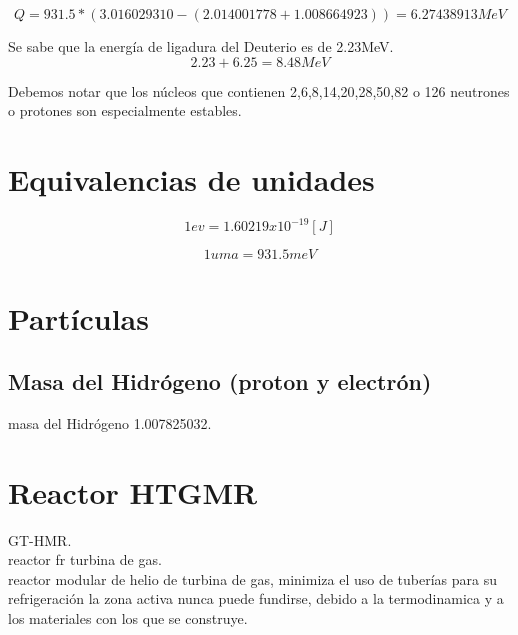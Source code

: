 \documentclass[]{article}
\begin{document}
\begin{equation}
Q=931.5*(3.016029310-(2.014001778+1.008664923))=6.27438913MeV
\end{equation}

Se sabe que la energía de ligadura del Deuterio es de 2.23MeV.\\

\begin{equation}
2.23+6.25=8.48 MeV
\end{equation}

Debemos notar que los núcleos que contienen 2,6,8,14,20,28,50,82 o 126 neutrones o protones son especialmente estables.\\



\section{Equivalencias de unidades}

\begin{equation}
   1ev=1.60219x10^{-19} [J]
\end{equation}

\begin{equation}
   1uma=931.5meV
\end{equation}


\section{Partículas}

\subsection{Masa del Hidrógeno (proton y electrón)}

masa del Hidrógeno  1.007825032.\\

\section{Reactor HTGMR}

GT-HMR.\\

reactor fr turbina de gas.\\

reactor modular de helio de turbina de gas, minimiza el uso de tuberías para su refrigeración
la zona activa nunca puede fundirse, debido a la termodinamica y a los materiales con los que se construye.\\
\end{document}
